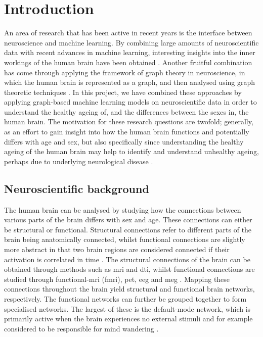\chapter{Introduction}



An area of research that has been active in recent years is the interface between neuroscience and machine learning. By combining large amounts of neuroscientific data with recent advances in machine learning, interesting insights into the inner workings of the human brain have been obtained \cite{neuro_ml, amoroso_multiplex_age, amoroso_multiplex_ad}. Another fruitful combination has come through applying the framework of graph theory in neuroscience, in which the human brain is represented as a graph, and then analysed using graph theoretic techniques \cite{chan, braph}. In this project, we have combined these approaches by applying graph-based machine learning models on neuroscientific data in order to understand the healthy ageing of, and the differences between the sexes in, the human brain. The motivation for these research questions are twofold; generally, as an effort to gain insight into how the human brain functions and potentially differs with age and sex, but also specifically since understanding the healthy ageing of the human brain may help to identify and understand unhealthy ageing, perhaps due to underlying neurological disease \cite{kaufmann}. 


\section{Neuroscientific background}

The human brain can be analysed by studying how the connections between various parts of the brain differs with sex and age. These connections can either be structural or functional. Structural connections refer to different parts of the brain being anatomically connected, whilst functional connections are slightly more abstract in that two brain regions are considered connected if their activation is correlated in time \cite{sporns}. The structural connections of the brain can be obtained through methods such as \acrshort{mri} and \acrshort{dti}, whilst functional connections are studied through functional-\acrshort{mri} (\acrshort{fmri}), \acrshort{pet}, \acrshort{eeg} and \acrshort{meg} \cite{hirsch}. Mapping these connections throughout the brain yield structural and functional brain networks, respectively. The functional networks can further be grouped together to form specialised networks. The largest of these is the default-mode network, which is primarily active when the brain experiences no external stimuli and for example considered to be responsible for mind wandering \cite{alves_dmn}.

